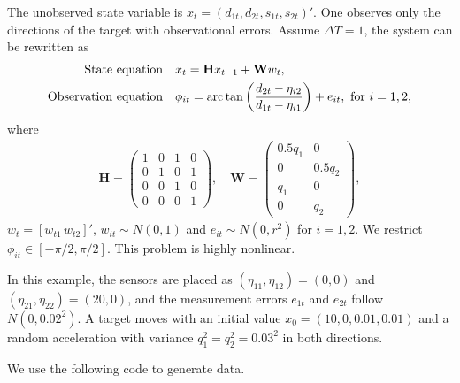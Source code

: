The unobserved state variable is $x_t=(d_{1t},d_{2t},s_{1t},s_{2t})'$. One observes only the directions of the target with observational errors. Assume $\Delta T=1$, the system can be rewritten as
\begin{align}
\mbox{State equation}&\quad  x_t=\mathbf{H} x_{t-1} +\mathbf{W} w_t \label{state_eq},\\
\mbox{Observation equation} & \quad \phi_{it}={\rm arc} \, {\rm tan} \left(\frac{d_{2t}-\eta_{i2}}{d_{1t}-\eta_{i1}} \right)+e_{it}, \mbox{ for } i=1,2,
\end{align}
where 
\begin{align*}
\mathbf{H}=
\begin{pmatrix}
1	&0	&1	&0\\
0	&1	&0	&1\\
0	&0	&1	&0\\
0	&0	&0	&1
\end{pmatrix}, \quad \mathbf{W}=
\begin{pmatrix}
0.5q_1 &0 	\\
0	&0.5q_2\\
q_1	&0\\
0	&q_2
\end{pmatrix},
\end{align*}
$w_t=[w_{t1}\, w_{t2}]'$, $w_{it} \sim N(0,1)$ and $e_{it} \sim N(0, r^2)$ for $i=1,2$. We restrict $\phi_{it} \in [-\pi/2, \pi/2]$. This problem is highly nonlinear.

In this example, the sensors are placed as $(\eta_{11},\eta_{12})=(0,0)$ and $(\eta_{21},\eta_{22})=(20,0)$, and the measurement errors $e_{1t}$ and $e_{2t}$ follow $N(0,0.02^2)$. A target moves with an initial value $x_0=(10,0,0.01,0.01)$ and a random acceleration with variance $q_1^2=q_2^2=0.03^2$ in both directions. 

We use the following code to generate data.

